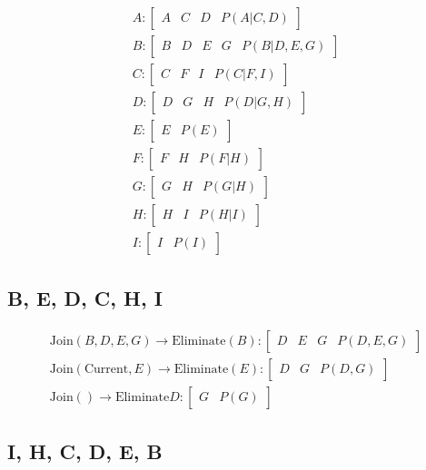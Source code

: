 \documentclass[en]{university}
\begin{document}
\begin{align*}
    A : \begin{bmatrix}
        A & C & D & P(A | C, D)
    \end{bmatrix} \\
    B : \begin{bmatrix}
        B & D & E & G & P(B | D, E, G)
    \end{bmatrix} \\
    C : \begin{bmatrix}
        C & F & I & P(C | F, I)
    \end{bmatrix} \\
    D : \begin{bmatrix}
        D & G & H & P(D | G, H)
    \end{bmatrix} \\
    E : \begin{bmatrix}
        E & P(E)
    \end{bmatrix} \\
    F : \begin{bmatrix}
        F & H & P(F | H)
    \end{bmatrix} \\
    G : \begin{bmatrix}
        G & H & P(G | H)
    \end{bmatrix} \\
    H : \begin{bmatrix}
        H & I & P(H | I)
    \end{bmatrix} \\
    I : \begin{bmatrix}
        I & P(I)
    \end{bmatrix}
\end{align*}

\subsection{B, E, D, C, H, I}

\begin{align*}
    \text{Join} (B, D, E, G)  \rightarrow \text{Eliminate} (B) : \begin{bmatrix}
        D & E & G & P(D, E, G)
    \end{bmatrix} \\
    \text{Join} (\text{Current}, E) \rightarrow \text{Eliminate} (E) : \begin{bmatrix}
        D & G & P(D, G)
    \end{bmatrix} \\
    \text{Join} () \rightarrow \text{Eliminate} D : \begin{bmatrix}
        G & P(G)
    \end{bmatrix}
\end{align*}

\subsection{I, H, C, D, E, B}
\end{document}
